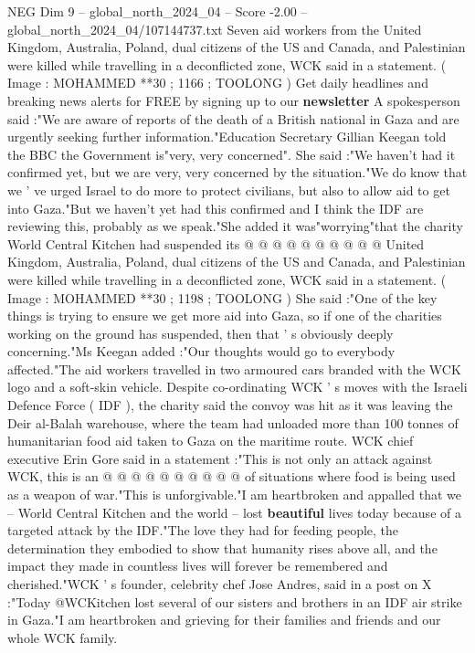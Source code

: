 \begin{textsample}{NEG Dim 9 – global\_north\_2024\_04 – Score -2.00 – global\_north\_2024\_04/107144737.txt}  \label{ex:f9_neg_224}
Seven aid workers from the United Kingdom, Australia, Poland, dual citizens of the US and Canada, and Palestinian were killed while travelling in a deconflicted zone, WCK said in a statement. ( Image : MOHAMMED **30 ; 1166 ; TOOLONG ) Get daily headlines and breaking news alerts for FREE by signing up to our \textbf{newsletter} A spokesperson said :"We are aware of reports of the death of a British national in Gaza and are urgently seeking further information."Education Secretary Gillian Keegan told the BBC the Government is"very, very concerned".
She said :"We haven't had it confirmed yet, but we are very, very concerned by the situation."We do know that we ' ve urged Israel to do more to protect civilians, but also to allow aid to get into Gaza."But we haven't yet had this confirmed and I think the IDF are reviewing this, probably as we speak."She added it was"worrying"that the charity World Central Kitchen had suspended its @ @ @ @ @ @ @ @ @ @ United Kingdom, Australia, Poland, dual citizens of the US and Canada, and Palestinian were killed while travelling in a deconflicted zone, WCK said in a statement. ( Image : MOHAMMED **30 ; 1198 ; TOOLONG ) She said :"One of the key things is trying to ensure we get more aid into Gaza, so if one of the charities working on the ground has suspended, then that ' s obviously deeply concerning."Ms Keegan added :"Our thoughts would go to everybody affected."The aid workers travelled in two armoured cars branded with the WCK logo and a soft-skin vehicle.
Despite co-ordinating WCK ' s moves with the Israeli Defence Force ( IDF ), the charity said the convoy was hit as it was leaving the Deir al-Balah warehouse, where the team had unloaded more than 100 tonnes of humanitarian food aid taken to Gaza on the maritime route.
WCK chief executive Erin Gore said in a statement :"This is not only an attack against WCK, this is an @ @ @ @ @ @ @ @ @ @ of situations where food is being used as a weapon of war."This is unforgivable."I am heartbroken and appalled that we -- World Central Kitchen and the world -- lost \textbf{beautiful} lives today because of a targeted attack by the IDF."The love they had for feeding people, the determination they embodied to show that humanity rises above all, and the impact they made in countless lives will forever be remembered and cherished."WCK ' s founder, celebrity chef Jose Andres, said in a post on X :"Today @WCKitchen lost several of our sisters and brothers in an IDF air strike in Gaza."I am heartbroken and grieving for their families and friends and our whole WCK family.

\end{textsample}
